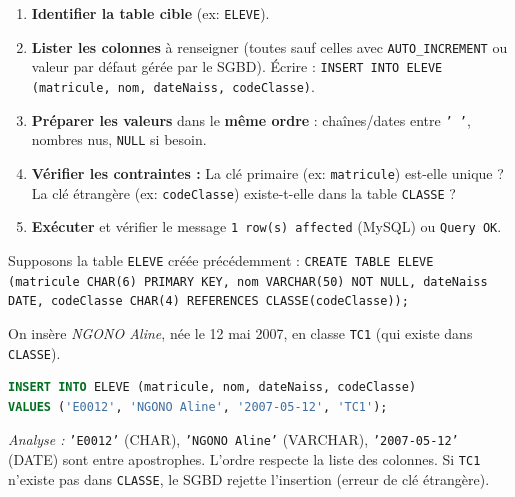 \documentclass[11pt]{article}
\begin{document}
\begin{methode}
\begin{enumerate}
    \item \textbf{Identifier la table cible} (ex: \texttt{ELEVE}).
    \item \textbf{Lister les colonnes} à renseigner (toutes sauf celles avec \texttt{AUTO\_INCREMENT} ou valeur par défaut gérée par le SGBD). Écrire : \texttt{INSERT INTO ELEVE (matricule, nom, dateNaiss, codeClasse)}.
    \item \textbf{Préparer les valeurs} dans le \textbf{même ordre} : chaînes/dates entre \texttt{' '}, nombres nus, \texttt{NULL} si besoin.
    \item \textbf{Vérifier les contraintes :} La clé primaire (ex: \texttt{matricule}) est-elle unique ? La clé étrangère (ex: \texttt{codeClasse}) existe-t-elle dans la table \texttt{CLASSE} ?
    \item \textbf{Exécuter} et vérifier le message \texttt{1 row(s) affected} (MySQL) ou \texttt{Query OK}.
\end{enumerate}
\end{methode}

\begin{exemplebox}
Supposons la table \texttt{ELEVE} créée précédemment :
\texttt{CREATE TABLE ELEVE (matricule CHAR(6) PRIMARY KEY, nom VARCHAR(50) NOT NULL, dateNaiss DATE, codeClasse CHAR(4) REFERENCES CLASSE(codeClasse));}

On insère \emph{NGONO Aline}, née le 12 mai 2007, en classe \texttt{TC1} (qui existe dans \texttt{CLASSE}).
\begin{lstlisting}[language=SQL]
INSERT INTO ELEVE (matricule, nom, dateNaiss, codeClasse)
VALUES ('E0012', 'NGONO Aline', '2007-05-12', 'TC1');
\end{lstlisting}
\emph{Analyse :} \texttt{'E0012'} (CHAR), \texttt{'NGONO Aline'} (VARCHAR), \texttt{'2007-05-12'} (DATE) sont entre apostrophes. L'ordre respecte la liste des colonnes. Si \texttt{TC1} n'existe pas dans \texttt{CLASSE}, le SGBD rejette l'insertion (erreur de clé étrangère).
\end{exemplebox}
\end{document}

